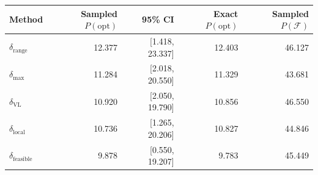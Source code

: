 \begin{tabular}{lrrrr}
\toprule
Method & Sampled $P(\mathrm{opt})$ & 95\% CI & Exact $P(\mathrm{opt})$ & Sampled $P(\mathcal F)$ \\
\midrule
$\delta_{\mathrm{range}}$ & 12.377 & [1.418, 23.337] & 12.403 & 46.127 \\
$\delta_{\mathrm{max}}$ & 11.284 & [2.018, 20.550] & 11.329 & 43.681 \\
$\delta_{\mathrm{VL}}$ & 10.920 & [2.050, 19.790] & 10.856 & 46.550 \\
$\delta_{\mathrm{local}}$ & 10.736 & [1.265, 20.206] & 10.827 & 44.846 \\
$\delta_{\mathrm{feasible}}$ & 9.878 & [0.550, 19.207] & 9.783 & 45.449 \\
\bottomrule
\end{tabular}
